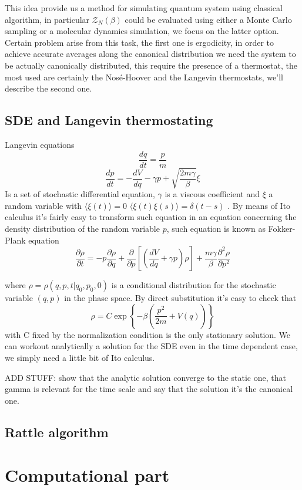\documentclass[10pt,a4paper]{article}
\begin{document}
This idea provide us a method for simulating quantum system using classical algorithm, in particular $\mathcal{Z}_N(\beta)$ could be evaluated using either a Monte Carlo sampling or a molecular dynamics simulation, we focus on the latter option.
Certain problem arise from this task, the first one is ergodicity, in order to achieve accurate averages along the canonical distribution we need the system to be actually canonically distributed, this require the presence of a thermostat, the most used are certainly the Nosé-Hoover and the Langevin thermostats, we'll describe the second one.

\subsection{SDE and Langevin thermostating}
Langevin equations
\[\frac{dq}{dt}=\frac{p}{m} \]
\[\frac{dp}{dt}=-\frac{dV}{dq}-\gamma p+\sqrt{\frac{2m\gamma}{\beta}} \xi \]
Is a set of stochastic differential equation, $\gamma$ is a viscous coefficient and $\xi$ a random variable with $\langle\xi(t)\rangle=0$ $\langle\xi(t)\xi(s)\rangle = \delta(t-s)$ .
By means of Ito calculus it's fairly easy to transform such equation in an equation concerning the density distribution of the random variable $p$, such equation is known as Fokker-Plank equation
\[ \frac{\partial\rho}{\partial t} = -p\frac{\partial\rho}{\partial q}+\frac{\partial}{\partial p}[(\frac{dV}{dq}+\gamma p)\rho]+\frac{m\gamma}{\beta}\frac{\partial^2\rho}{\partial p^2} \]

where $\rho= \rho(q,p,t|q_0,p_0,0)$ is a conditional distribution for the stochastic variable $(q,p)$ in the phase space.
By direct substitution it's easy to check that
\[\rho = C \exp	\left\{ -\beta(\frac{p^2}{2m}+V(q)) \right\}  \]
with C fixed by the normalization condition is the only stationary solution.
We can workout analytically a solution for the SDE even in the time dependent case, we simply need a little bit of Ito calculus. 

ADD STUFF: show that the analytic solution converge to the static one, that gamma is relevant for the time scale and say that the solution it's the canonical one.
\subsection{Rattle algorithm}

\section{Computational part}
\end{document}

